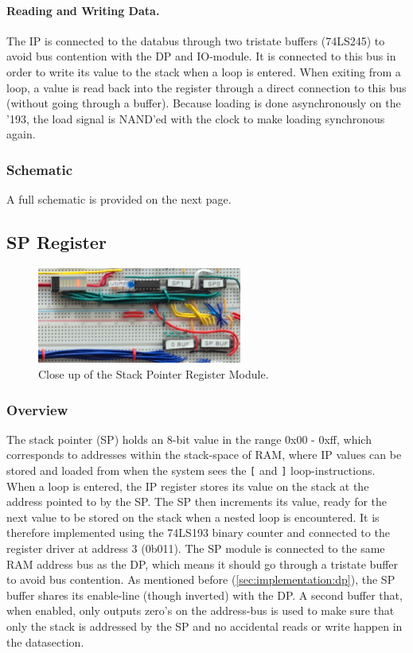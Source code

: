 \paragraph{Reading and Writing Data.} The IP is connected to the databus through two tristate buffers (74LS245) to avoid bus contention with the DP and IO-module. It is connected to this bus in order to write its value to the stack when a loop is entered. When exiting from a loop, a value is read back into the register through a direct connection to this bus (without going through a buffer). Because loading is done asynchronously on the '193, the load signal is NAND'ed with the clock to make loading synchronous again.

\subsubsection{Schematic}
A full schematic is provided on the next page.



\subsection{SP Register}
\begin{figure}[H]
  \centering
  \includegraphics[width=0.6\textwidth]{img/spregistercloseup}
  \caption{Close up of the Stack Pointer Register Module.}
  \label{fig:spregcloseup}
\end{figure}

\subsubsection{Overview}
The stack pointer (SP) holds an 8-bit value in the range 0x00 - 0xff, which corresponds to addresses within the stack-space of RAM, where IP values can be stored and loaded from when the system sees the \texttt{[} and \texttt{]} loop-instructions. When a loop is entered, the IP register stores its value on the stack at the address pointed to by the SP. The SP then increments its value, ready for the next value to be stored on the stack when a nested loop is encountered. It is therefore implemented using the 74LS193 binary counter and connected to the register driver at address 3 (0b011). The SP module is connected to the same RAM address bus as the DP, which means it should go through a tristate buffer to avoid bus contention. As mentioned before (\ref{sec:implementation:dp}), the SP buffer shares its enable-line (though inverted) with the DP. A second buffer that, when enabled, only outputs zero's on the address-bus is used to make sure that only the stack is addressed by the SP and no accidental reads or write happen in the datasection. 


